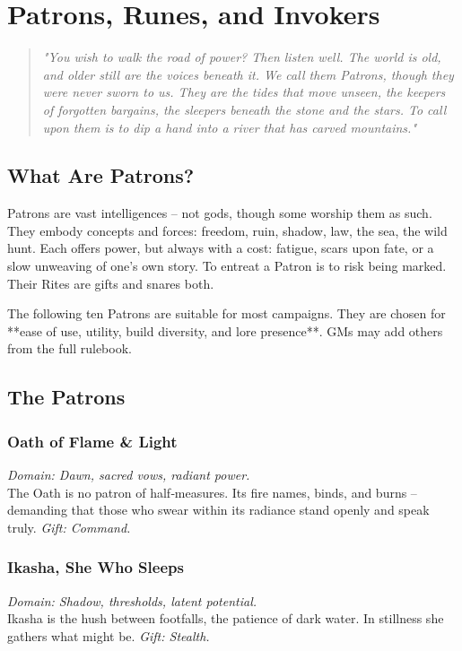 \clearpage
\section{Patrons, Runes, and Invokers}
\label{sec:patrons-srd}

\begin{quote}
\emph{"You wish to walk the road of power? Then listen well. The world is old, and older still are the voices beneath it. We call them Patrons, though they were never sworn to us. They are the tides that move unseen, the keepers of forgotten bargains, the sleepers beneath the stone and the stars. To call upon them is to dip a hand into a river that has carved mountains."}
\end{quote}

\subsection{What Are Patrons?}
Patrons are vast intelligences -- not gods, though some worship them as such. They embody concepts and forces: freedom, ruin, shadow, law, the sea, the wild hunt. Each offers power, but always with a cost: fatigue, scars upon fate, or a slow unweaving of one's own story. To entreat a Patron is to risk being marked. Their Rites are gifts and snares both.

The following ten Patrons are suitable for most campaigns. They are chosen for **ease of use, utility, build diversity, and lore presence**. GMs may add others from the full rulebook.

\subsection{The Patrons}

\subsubsection{Oath of Flame \& Light}
\emph{Domain: Dawn, sacred vows, radiant power.} \\
The Oath is no patron of half‑measures. Its fire names, binds, and burns -- demanding that those who swear within its radiance stand openly and speak truly. \textit{Gift: Command.}

\subsubsection{Ikasha, She Who Sleeps}
\emph{Domain: Shadow, thresholds, latent potential.} \\
Ikasha is the hush between footfalls, the patience of dark water. In stillness she gathers what might be. \textit{Gift: Stealth.}

